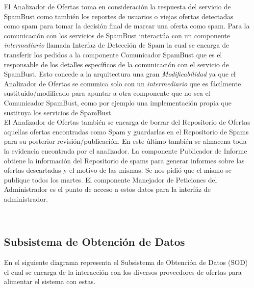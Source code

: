 El \textsf{Analizador de Ofertas} toma en consideración la respuesta del servicio de \textsf{SpamBust} como también los reportes de usuarios o viejas ofertas detectadas como spam para tomar la decisión final de marcar una oferta como spam. Para la comunicación con los servicios de \textsf{SpamBust} interactúa con un componente \emph{intermediario} llamada \textsf{Interfaz de Detección de Spam} la cual se encarga de transferir los pedidos a la componente \textsf{Comunicador SpamBust} que es el responsable de los detalles específicos de la comunicación con el servicio de \textsf{SpamBust}. Esto concede a la arquitectura una gran \emph{Modificabilidad} ya que el \textsf{Analizador de Ofertas} se comunica solo con un \emph{intermediario} que es fácilmente sustituido/modificado para apuntar a otra componente que no sea el \textsf{Comunicador SpamBust}, como por ejemplo una implementación propia que sustituya los servicios de \textsf{SpamBust}.\\

El \textsf{Analizador de Ofertas} también se encarga de borrar del \textsf{Repositorio de Ofertas} aquellas ofertas encontradas como Spam y guardarlas en el \textsf{Repositorio de Spams} para su posterior revisión/publicación. En este último también se almacena toda la evidencia encontrada por el \textsf{analizador}. La componente \textsf{Publicador de Informe} obtiene la información del \textsf{Repositorio de spams} para generar informes sobre las ofertas descartadas y el motivo de las mismas. Se nos pidió que el mismo se publique todos los martes. El componente \textsf{Manejador de Peticiones del Administrador} es el punto de acceso a estos datos para la \textsf{interfáz de administrador}.


\\
\subsection{Subsistema de Obtención de Datos}


En el siguiente diagrama representa el Subsistema de Obtención de Datos (\textsf{SOD}) el cual se encarga de la interacción con los diversos proveedores de ofertas para alimentar el sistema con estas.\\

